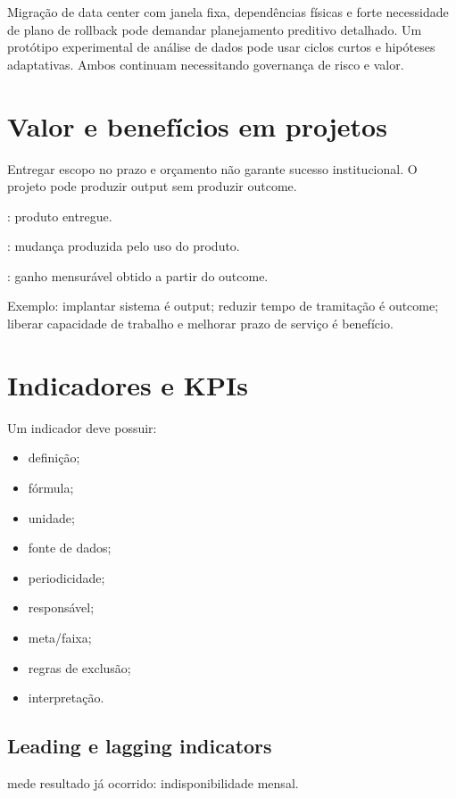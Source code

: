 \begin{exemplo}[tailoring]
Migração de data center com janela fixa, dependências físicas e forte necessidade de plano de rollback pode demandar planejamento preditivo detalhado. Um protótipo experimental de análise de dados pode usar ciclos curtos e hipóteses adaptativas. Ambos continuam necessitando governança de risco e valor.
\end{exemplo}

\section{Valor e benefícios em projetos}

Entregar escopo no prazo e orçamento não garante sucesso institucional. O projeto pode produzir output sem produzir outcome.

: produto entregue.

: mudança produzida pelo uso do produto.

: ganho mensurável obtido a partir do outcome.

Exemplo: implantar sistema é output; reduzir tempo de tramitação é outcome; liberar capacidade de trabalho e melhorar prazo de serviço é benefício.

\section{Indicadores e KPIs}

Um indicador deve possuir:
\begin{itemize}
\item definição;
\item fórmula;
\item unidade;
\item fonte de dados;
\item periodicidade;
\item responsável;
\item meta/faixa;
\item regras de exclusão;
\item interpretação.
\end{itemize}

\subsection{Leading e lagging indicators}

 mede resultado já ocorrido: indisponibilidade mensal.

